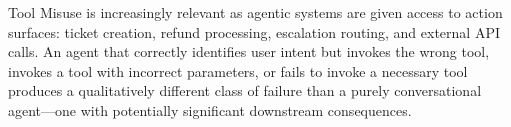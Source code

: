 Tool Misuse is increasingly relevant as agentic systems are given access to action surfaces: ticket creation, refund processing, escalation routing, and external API calls. An agent that correctly identifies user intent but invokes the wrong tool, invokes a tool with incorrect parameters, or fails to invoke a necessary tool produces a qualitatively different class of failure than a purely conversational agent---one with potentially significant downstream consequences.

